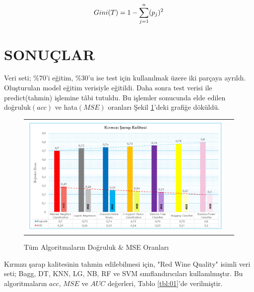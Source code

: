 \documentclass[conference]{IEEEtran}
\begin{document}
\begin{equation}
\label{eq:07}
\Large Gini(T)=1-\sum_{j=1}^{n}(p_{j})^{2}
\end{equation}

\pagebreak
\section{\textbf{SONUÇLAR}}

\quad Veri seti; $\%70$'i eğitim, $\%30$'u ise test için kullanılmak üzere iki parçaya ayrıldı. Oluşturulan model eğitim verisiyle eğitildi. Daha sonra test verisi ile predict(tahmin) işlemine tâbi tutuldu. Bu işlemler sonucunda elde edilen doğruluk$(acc)$ ve hata$(MSE)$ oranları Şekil \ref{fig:08}'deki grafiğe döküldü.

\begin{figure}[!h]
	\centering
	\begin{center}
		\begin{tabular}{cc}
			\includegraphics[scale=0.325]{pictures/pic_08.png}&
		\end{tabular}
	\end{center}
	\caption{Tüm Algoritmaların Doğruluk \& MSE Oranları}
	\label{fig:08}
\end{figure}

\quad Kırmızı şarap kalitesinin tahmin edilebilmesi için, "Red Wine Quality"\cite{4} isimli veri seti; Bagg, DT, KNN, LG, NB, RF ve SVM sınıflandırıcıları kullanılmıştır. Bu algoritmaların $acc$, $MSE$ ve $AUC$ değerleri, Tablo \ref{tbl:01}'de verilmiştir.
\end{document}
